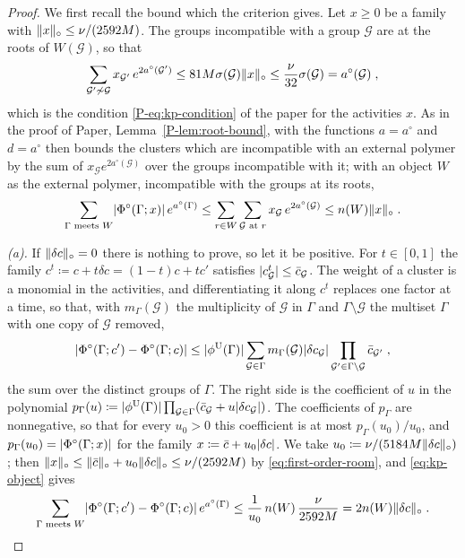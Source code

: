 \documentclass[11pt]{preprint}
\DeclarePairedDelimiter{\abs}{\lvert}{\rvert}
\DeclarePairedDelimiter{\norm}{\lVert}{\rVert}
\numberwithin{equation}{section}
\theoremstyle{definition}
\theoremstyle{remark}
\theoremstyle{plain}
\begin{document}
\begin{proof}
We first recall the bound which the criterion gives. Let $x \geq 0$ be a family with $\norm{x}_\circ \leq \nu/(2592M)$. The groups incompatible with a group $\mathcal G$ are at the roots of $W(\mathcal G)$, so that
\[
    \sum_{\mathcal G' \not\sim \mathcal G}x_{\mathcal G'}\,e^{2a^\circ(\mathcal G')} \leq 81M\sigma(\mathcal G)\norm{x}_\circ \leq \frac{\nu}{32}\sigma(\mathcal G) = a^\circ(\mathcal G)\;,
\]
which is the condition \eqref{P-eq:kp-condition} of the paper for the activities $x$. As in the proof of Paper, Lemma~\ref{P-lem:root-bound}, \cite[Theorem~5.4]{FriedliVelenik} with the functions $a = a^\circ$ and $d = a^\circ$ then bounds the clusters which are incompatible with an external polymer by the sum of $x_{\mathcal G}e^{2a^\circ(\mathcal G)}$ over the groups incompatible with it; with an object $W$ as the external polymer, incompatible with the groups at its roots,
\begin{equation}\label{eq:kp-object}
    \sum_{\Gamma \text{ meets } W}\abs{\Phi^\circ(\Gamma; x)}\,e^{a^\circ(\Gamma)} \leq \sum_{r \in W}\sum_{\mathcal G \text{ at } r}x_{\mathcal G}\,e^{2a^\circ(\mathcal G)} \leq n(W)\norm{x}_\circ\;.
\end{equation}

\emph{(a).} If $\norm{\delta c}_\circ = 0$ there is nothing to prove, so let it be positive. For $t \in [0, 1]$ the family $c^t \coloneqq c + t\delta c = (1 - t)c + tc'$ satisfies $\abs{c^t_{\mathcal G}} \leq \bar c_{\mathcal G}$. The weight of a cluster is a monomial in the activities, and differentiating it along $c^t$ replaces one factor at a time, so that, with $m_\Gamma(\mathcal G)$ the multiplicity of $\mathcal G$ in $\Gamma$ and $\Gamma \setminus \mathcal G$ the multiset $\Gamma$ with one copy of $\mathcal G$ removed,
\begin{equation}\label{eq:first-order-derivative}
    \abs{\Phi^\circ(\Gamma; c') - \Phi^\circ(\Gamma; c)} \leq \abs{\phi^{\mathrm U}(\Gamma)}\sum_{\mathcal G \in \Gamma}m_\Gamma(\mathcal G)\abs{\delta c_{\mathcal G}}\prod_{\mathcal G' \in \Gamma \setminus \mathcal G}\bar c_{\mathcal G'}\;,
\end{equation}
the sum over the distinct groups of $\Gamma$. The right side is the coefficient of $u$ in the polynomial $p_\Gamma(u) \coloneqq \abs{\phi^{\mathrm U}(\Gamma)}\prod_{\mathcal G \in \Gamma}(\bar c_{\mathcal G} + u\abs{\delta c_{\mathcal G}})$. The coefficients of $p_\Gamma$ are nonnegative, so that for every $u_0 > 0$ this coefficient is at most $p_\Gamma(u_0)/u_0$, and $p_\Gamma(u_0) = \abs{\Phi^\circ(\Gamma; x)}$ for the family $x \coloneqq \bar c + u_0\abs{\delta c}$. We take $u_0 \coloneqq \nu/(5184M\norm{\delta c}_\circ)$; then $\norm{x}_\circ \leq \norm{\bar c}_\circ + u_0\norm{\delta c}_\circ \leq \nu/(2592M)$ by \eqref{eq:first-order-room}, and \eqref{eq:kp-object} gives
\[
    \sum_{\Gamma \text{ meets } W}\abs{\Phi^\circ(\Gamma; c') - \Phi^\circ(\Gamma; c)}\,e^{a^\circ(\Gamma)} \leq \frac{1}{u_0}\,n(W)\,\frac{\nu}{2592M} = 2n(W)\norm{\delta c}_\circ\;.
\]


\end{proof}
\end{document}

